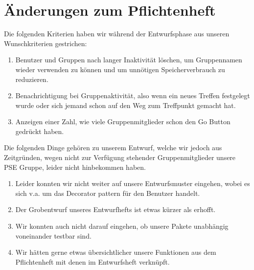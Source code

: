 \section{Änderungen zum Pflichtenheft}

Die folgenden Kriterien haben wir während der Entwurfsphase aus unseren Wunschkriterien gestrichen:\\
\begin{enumerate}
	\item Benutzer und Gruppen nach langer Inaktivität löschen, um Gruppennamen wieder verwenden zu können und um unnötigen Speicherverbrauch zu reduzieren.
	\item Benachrichtigung bei Gruppenaktivität, also wenn ein neues Treffen festgelegt wurde oder sich jemand schon auf den Weg zum Treffpunkt gemacht hat.
	\item Anzeigen einer Zahl, wie viele Gruppenmitglieder schon den Go Button gedrückt haben.
\end{enumerate}

Die folgenden Dinge gehören zu unserem Entwurf, welche wir jedoch aus Zeitgründen, wegen nicht zur Verfügung stehender Gruppenmitglieder unsere PSE Gruppe, leider nicht hinbekommen haben.
\begin{enumerate}
	\item Leider konnten wir nicht weiter auf unsere Entwurfsmuster eingehen, wobei es sich v.a. um das Decorator pattern für den Benutzer handelt.
	\item Der Grobentwurf unseres Entwurfhefts ist etwas kürzer als erhofft.
	\item Wir konnten auch nicht darauf eingehen, ob unsere Pakete unabhängig voneinander testbar sind.
	\item Wir hätten gerne etwas übersichtlicher unsere Funktionen aus dem Pflichtenheft mit denen im Entwurfsheft verknüpft.
\end{enumerate}

